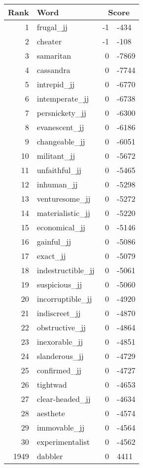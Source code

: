 \begin{longtable}[!htbp]{| rlr@{.}l |}
    \hline
    \textbf{Rank} & \textbf{Word} & \multicolumn{2}{c|}{\textbf{Score}} \\
    \hline
    \endhead
    1 & frugal\_jj & -1 & -434 \\
    2 & cheater & -1 & -108 \\
    3 & samaritan & 0 & -7869 \\
    4 & cassandra & 0 & -7744 \\
    5 & intrepid\_jj & 0 & -6770 \\
    6 & intemperate\_jj & 0 & -6738 \\
    7 & persnickety\_jj & 0 & -6300 \\
    8 & evanescent\_jj & 0 & -6186 \\
    9 & changeable\_jj & 0 & -6051 \\
    10 & militant\_jj & 0 & -5672 \\
    11 & unfaithful\_jj & 0 & -5465 \\
    12 & inhuman\_jj & 0 & -5298 \\
    13 & venturesome\_jj & 0 & -5272 \\
    14 & materialistic\_jj & 0 & -5220 \\
    15 & economical\_jj & 0 & -5146 \\
    16 & gainful\_jj & 0 & -5086 \\
    17 & exact\_jj & 0 & -5079 \\
    18 & indestructible\_jj & 0 & -5061 \\
    19 & suspicious\_jj & 0 & -5060 \\
    20 & incorruptible\_jj & 0 & -4920 \\
    21 & indiscreet\_jj & 0 & -4870 \\
    22 & obstructive\_jj & 0 & -4864 \\
    23 & inexorable\_jj & 0 & -4851 \\
    24 & slanderous\_jj & 0 & -4729 \\
    25 & confirmed\_jj & 0 & -4727 \\
    26 & tightwad & 0 & -4653 \\
    27 & clear-headed\_jj & 0 & -4634 \\
    28 & aesthete & 0 & -4574 \\
    29 & immovable\_jj & 0 & -4564 \\
    30 & experimentalist & 0 & -4562 \\
    1949 & dabbler & 0 & 4411 \\

\end{longtable}
